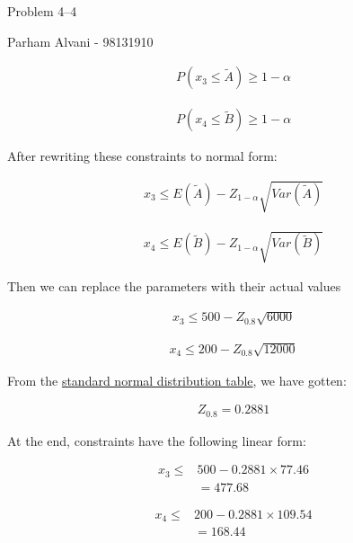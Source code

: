 \documentclass{article}
\begin{document}
\large %


{\Large Problem 4--4 %
\hfill  }

\begin{center}
{\Large Parham Alvani - 98131910} %
\end{center}
\vspace{0.05in}

\begin{align*}
        P(x_3 \le \tilde{A}) \ge 1 - \alpha
\end{align*}

\begin{align*}
        P(x_4 \le \tilde{B}) \ge 1 - \alpha
\end{align*}

\par
After rewriting these constraints to normal form:

\begin{align*}
        x_3 \le E(\tilde{A}) - Z_{1-\alpha}\sqrt{Var(\tilde{A})}
\end{align*}

\begin{align*}
        x_4 \le E(\tilde{B}) - Z_{1-\alpha}\sqrt{Var(\tilde{B})}
\end{align*}

\par
Then we can replace the parameters with their actual values

\begin{align*}
        x_3 \le 500 - Z_{0.8}\sqrt{6000}
\end{align*}

\begin{align*}
        x_4 \le 200 - Z_{0.8}\sqrt{12000}
\end{align*}

From the \href{https://www.growingknowing.com/GKStatsBookNormalTable1.html}{standard normal distribution table}, we have gotten:


\begin{align*}
        Z_{0.8} = 0.2881
\end{align*}

At the end, constraints have the following linear form:

\begin{align*}
        x_3 \le &500 - 0.2881 \times 77.46 \\
        & = 477.68
\end{align*}

\begin{align*}
        x_4 \le &200 - 0.2881 \times 109.54 \\
        & = 168.44
\end{align*}
\end{document}
